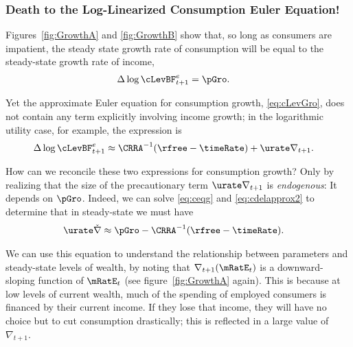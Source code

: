 \documentclass{\handout}
\begin{document}
\subsubsection{Death to the Log-Linearized Consumption Euler Equation!}

Figures~\ref{fig:GrowthA} and \ref{fig:GrowthB} show that, so long as
consumers are impatient, the steady state growth rate of consumption
will be equal to the steady-state growth rate of income,
\begin{equation}\begin{gathered}\begin{aligned}
        \Delta \log \cLevBF^{e}_{t+1} & =  \pGro. \label{eq:ceqg}
\end{aligned}\end{gathered}\end{equation}

Yet the approximate Euler equation for consumption growth, \eqref{eq:cLevGro}, does 
not contain any term explicitly involving income growth; in the logarithmic utility
case, for example, the expression is
\begin{equation}\begin{gathered}\begin{aligned}
         \Delta \log \cLevBF^{e}_{t+1} & \approx  \CRRA^{-1}(\rfree-\timeRate) +  \urate \nabla _{t+1}. \label{eq:cdelapprox2}
\end{aligned}\end{gathered}\end{equation}

How can we reconcile these two expressions for consumption growth?
Only by realizing that the size of the precautionary term $\urate
\nabla_{t+1}$ is {\it endogenous}: It depends on $\pGro$.  Indeed, we
can solve \eqref{eq:ceqg} and \eqref{eq:cdelapprox2} to determine that
in steady-state we must have 
\begin{equation}\begin{gathered}\begin{aligned}
        \urate \check{\nabla} & \approx  \pGro - \CRRA^{-1}(\rfree-\timeRate). \label{eq:prectermSS}
\end{aligned}\end{gathered}\end{equation}

We can use this equation to understand the relationship between
parameters and steady-state levels of wealth, by noting that
$\nabla_{t+1}(\mRatE_{t})$ is a downward-sloping function of
$\mRatE_{t}$ (see figure~\ref{fig:GrowthA} again).  This is because at
low levels of current wealth, much of the spending of employed
consumers is financed by their current income.  If they lose that
income, they will have no choice but to cut consumption drastically; this is
reflected in a large value of $\nabla_{t+1}$.
\end{document}
